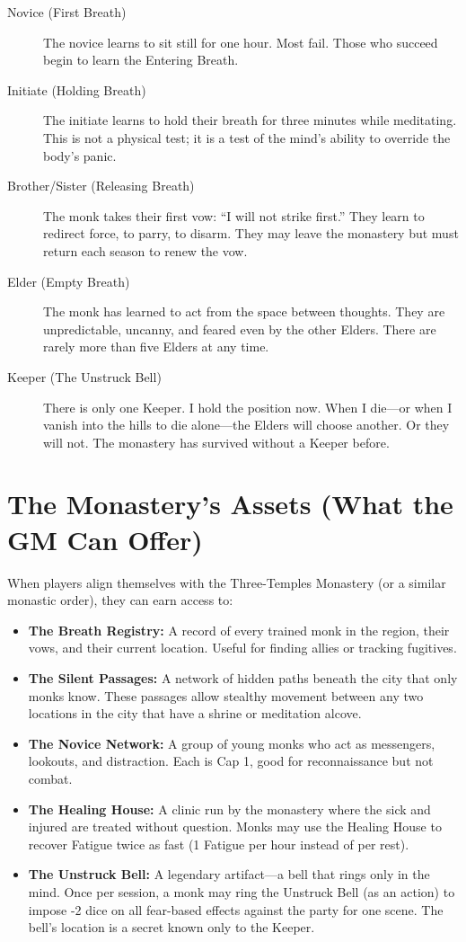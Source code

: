 \documentclass[11pt]{book}
\begin{document}
\begin{description}
    \item[Novice (First Breath)] The novice learns to sit still for one hour. Most fail. Those who succeed begin to learn the Entering Breath.
    \item[Initiate (Holding Breath)] The initiate learns to hold their breath for three minutes while meditating. This is not a physical test; it is a test of the mind's ability to override the body's panic.
    \item[Brother/Sister (Releasing Breath)] The monk takes their first vow: ``I will not strike first.'' They learn to redirect force, to parry, to disarm. They may leave the monastery but must return each season to renew the vow.
    \item[Elder (Empty Breath)] The monk has learned to act from the space between thoughts. They are unpredictable, uncanny, and feared even by the other Elders. There are rarely more than five Elders at any time.
    \item[Keeper (The Unstruck Bell)] There is only one Keeper. I hold the position now. When I die---or when I vanish into the hills to die alone---the Elders will choose another. Or they will not. The monastery has survived without a Keeper before.
\end{description}

\section{The Monastery's Assets (What the GM Can Offer)}

When players align themselves with the Three-Temples Monastery (or a similar monastic order), they can earn access to:

\begin{itemize}
    \item \textbf{The Breath Registry:} A record of every trained monk in the region, their vows, and their current location. Useful for finding allies or tracking fugitives.
    \item \textbf{The Silent Passages:} A network of hidden paths beneath the city that only monks know. These passages allow stealthy movement between any two locations in the city that have a shrine or meditation alcove.
    \item \textbf{The Novice Network:} A group of young monks who act as messengers, lookouts, and distraction. Each is Cap 1, good for reconnaissance but not combat.
    \item \textbf{The Healing House:} A clinic run by the monastery where the sick and injured are treated without question. Monks may use the Healing House to recover Fatigue twice as fast (1 Fatigue per hour instead of per rest).
    \item \textbf{The Unstruck Bell:} A legendary artifact---a bell that rings only in the mind. Once per session, a monk may ring the Unstruck Bell (as an action) to impose -2 dice on all fear-based effects against the party for one scene. The bell's location is a secret known only to the Keeper.
\end{itemize}
\end{document}
